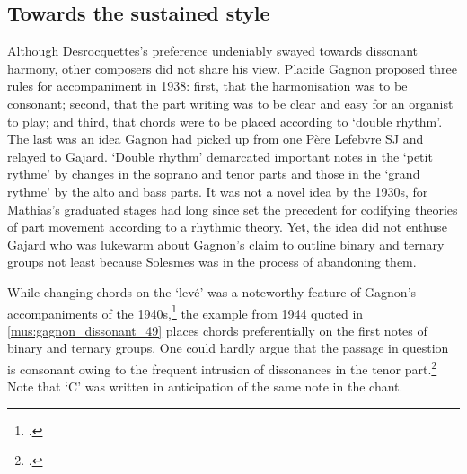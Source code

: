 \subsection{Towards the sustained style}
Although Desrocquettes's preference undeniably swayed towards dissonant harmony, other composers did not share his view.
Placide Gagnon proposed three rules for accompaniment in 1938: first, that the harmonisation was to be consonant; second, that the part writing was to be clear and easy for an organist to play; and third, that chords were to be placed according to `double rhythm'.
The last was an idea Gagnon had picked up from one Père Lefebvre SJ and relayed to Gajard.
`Double rhythm' demarcated important notes in the `petit rythme' by changes in the soprano and tenor parts and those in the `grand rythme' by the alto and bass parts.
It was not a novel idea by the 1930s, for Mathias's graduated stages had long since set the precedent for codifying theories of part movement according to a rhythmic theory.
Yet, the idea did not enthuse Gajard who was lukewarm about Gagnon's claim to outline binary and ternary groups not least because Solesmes was in the process of abandoning them.
\nowidow[2]

While changing chords on the `levé' was a noteworthy feature of Gagnon's \mbox{accompaniments} of the 1940s,\footcites{GagnonAccompagnementveprestemps1940}{GagnonMesseSSMartyrs1940} the example from 1944 quoted in \cref{mus:gagnon_dissonant_49} places chords preferentially on the first notes of binary and ternary groups.
One could hardly argue that the passage in question is consonant owing to the frequent intrusion of dissonances in the tenor part.\footcite[pp. viii, 4--5]{GagnonAccompagnementchantssaluts1944}
Note that `C'\kern 1pt\natural{} was written in anticipation of the same note in the chant.

